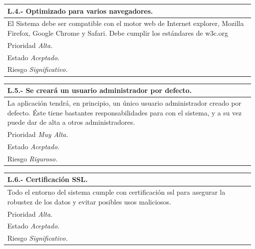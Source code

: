 \documentclass[a4paper,oneside,11pt]{book}
\begin{document}
\begin{center}
\begin{tabulary}{15cm}{|L|}
	\hline
		\bf{L.4.- Optimizado para varios navegadores.} \\
	\hline
		El Sistema debe ser compatible con el motor web de Internet explorer, Mozilla Firefox, Google Chrome y Safari. Debe cumplir los estándares de w3c.org\\
	\hline
		Prioridad \textit{Alta.} \\
	\hline
		Estado \textit{Aceptado.} \\
	\hline
		Riesgo \textit{Significativo.} \\
	\hline
\end{tabulary}
\end{center}

\begin{center}
\begin{tabulary}{15cm}{|L|}
	\hline
		\bf{L.5.- Se creará un usuario administrador por defecto.} \\
	\hline
		La aplicación tendrá, en principio, un único usuario administrador creado por defecto. Éste tiene bastantes responsabilidades para con el sistema, y a su vez puede dar de alta a otros administradores. \\
	\hline
		Prioridad \textit{Muy Alta.} \\
	\hline
		Estado \textit{Aceptado.} \\
	\hline
		Riesgo \textit{Riguroso.} \\
	\hline
\end{tabulary}
\end{center}

\begin{center}
\begin{tabulary}{15cm}{|L|}
	\hline
		\bf{L.6.- Certificación SSL.} \\
	\hline
		Todo el entorno del sistema cumple con certificación ssl para asegurar la robustez de los datos y evitar posibles usos maliciosos. \\
	\hline
		Prioridad \textit{Alta.} \\
	\hline
		Estado \textit{Aceptado.} \\
	\hline
		Riesgo \textit{Significativo.} \\
	\hline
\end{tabulary}
\end{center}
\end{document}
